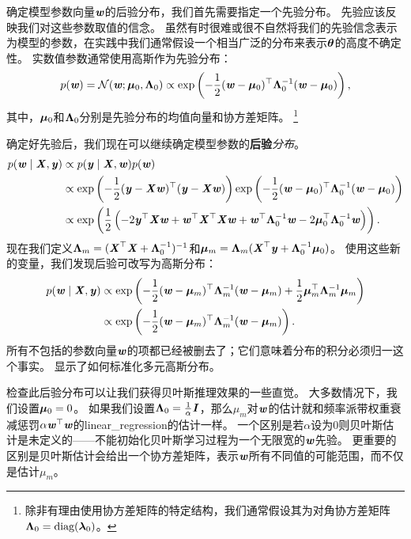
确定模型参数向量$\Vw$的后验分布，我们首先需要指定一个先验分布。
先验应该反映我们对这些参数取值的信念。
虽然有时很难或很不自然将我们的先验信念表示为模型的参数，在实践中我们通常假设一个相当广泛的分布来表示$\Vtheta$的高度不确定性。
实数值参数通常使用高斯作为先验分布：
\begin{equation}
    p(\Vw) = \mathcal{N}( \Vw; \Vmu_0, \VLambda_0 ) 
    \propto \exp\left( 
    -\frac{1}{2}( \Vw-\Vmu_0 )^\Tsp \VLambda_0^{-1} ( \Vw-\Vmu_0 )
    \right),
\end{equation}
其中，$\Vmu_0$和$\VLambda_0$分别是先验分布的均值向量和协方差矩阵。
\footnote{除非有理由使用协方差矩阵的特定结构，我们通常假设其为对角协方差矩阵
$\VLambda_0=\text{diag}(\Vlambda_0)$。
}

确定好先验后，我们现在可以继续确定模型参数的\textbf{后验}\emph{分布}。
\begin{align}
    p(\Vw \mid \MX, \Vy) &\propto p(\Vy \mid \MX, \Vw) p(\Vw) \\
    & \propto 
        \exp\left( 
            -\frac{1}{2} ( \Vy - \MX\Vw )^\Tsp( \Vy - \MX\Vw )
        \right)
        \exp\left(
    -\frac{1}{2} ( \Vw - \Vmu_0)^\Tsp \VLambda_0^{-1} ( \Vw - \Vmu_0)
        \right) \\
    & \propto \exp
    \left(
    \frac{1}{2}\left(
    -2\Vy^\Tsp\MX\Vw + \Vw^\Tsp\MX^\Tsp\MX\Vw + \Vw^\Tsp\VLambda_0^{-1}\Vw - 
    2\Vmu_0^\Tsp \VLambda_0^{-1}\Vw
    \right)
    \right).
\end{align}
现在我们定义$\VLambda_m = (\MX^\Tsp\MX + \VLambda_0^{-1})^{-1}$和$\Vmu_m = \VLambda_m ( \MX^\Tsp \Vy + \VLambda_0^{-1}\Vmu_0 )$。
使用这些新的变量，我们发现后验可改写为高斯分布：
\begin{align}
    p(\Vw \mid \MX, \Vy) &\propto \exp \left(
    -\frac{1}{2} (\Vw - \Vmu_m )^\Tsp \VLambda_m^{-1}  (\Vw - \Vmu_m ) 
    + \frac{1}{2} \Vmu_m^\Tsp \VLambda_m^{-1}  \Vmu_m 
    \right) \\
    &\propto \exp\left(
    -\frac{1}{2} (\Vw - \Vmu_m)^\Tsp \VLambda_m^{-1} (\Vw - \Vmu_m)
    \right).
\end{align}
所有不包括的参数向量$\Vw$的项都已经被删去了；它们意味着分布的积分必须归一这个事实。
显示了如何标准化多元高斯分布。


检查此后验分布可以让我们获得贝叶斯推理效果的一些直觉。
大多数情况下，我们设置$\Vmu_0 = 0$。
如果我们设置$\VLambda_0 = \frac{1}{\alpha}\MI$，那么$\mu_m$对$\Vw$的估计就和频率派带权重衰减惩罚$\alpha\Vw^\Tsp\Vw$的\gls{linear_regression}的估计一样。
一个区别是若$\alpha$设为$0$则贝叶斯估计是未定义的——不能初始化贝叶斯学习过程为一个无限宽的$\Vw$先验。
更重要的区别是贝叶斯估计会给出一个协方差矩阵，表示$\Vw$所有不同值的可能范围，而不仅是估计$\mu_m$。

